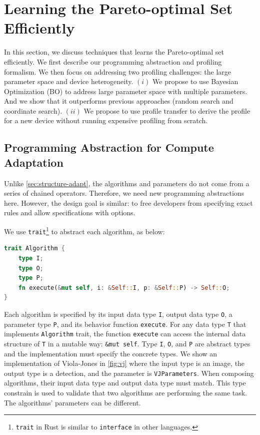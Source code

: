 \section{Learning the Pareto-optimal Set Efficiently }
\label{sec:learn-pareto-optim}

In this section, we discuss techniques that learns the Pareto-optimal set
efficiently. We first describe our programming abstraction and profiling
formalism. We then focus on addressing two profiling challenges: the large
parameter space and device heterogeneity. $(i)$ We propose to use Bayesian
Optimization (BO) to address large parameter space with multiple parameters. And
we show that it outperforms previous approaches (random search and coordinate
search). $(ii)$ We propose to use profile transfer to derive the profile for a
new device without running expensive profiling from scratch.

\subsection{Programming Abstraction for Compute Adaptation}
\label{sec:progr-abstr}

Unlike \autoref{sec:structure-adapt}, the algorithms and parameters do not come
from a series of chained operators. Therefore, we need new programming
abstractions here. However, the design goal is similar: to free developers from
specifying exact rules and allow specifications with options.

We use \texttt{trait}\footnote{\texttt{trait} in Rust is similar to
  \texttt{interface} in other languages.} to abstract each algorithm, as below:

\begin{lstlisting}[xleftmargin=.1\textwidth, xrightmargin=.1\textwidth, language=Rust]
trait Algorithm {
    type I;
    type O; 
    type P;
    fn execute(&mut self, i: &Self::I, p: &Self::P) -> Self::O;
}
\end{lstlisting}

Each algorithm is specified by its input data type \texttt{I}, output data type
\texttt{O}, a parameter type \texttt{P}, and its behavior function
\texttt{execute}. For any data type \texttt{T} that implements
\texttt{Algorithm} trait, the function \texttt{execute} can access the internal
data structure of \texttt{T} in a mutable way: \texttt{\&mut self}. Type
\texttt{I}, \texttt{O}, and \texttt{P} are abstract types and the implementation
must specify the concrete types. We show an implementation of Viola-Jones in
\autoref{fig:vj} where the input type is an image, the output type is a
detection, and the parameter is \texttt{VJParameters}. When composing
algorithms, their input data type and output data type must match. This type
constrain is used to validate that two algorithms are performing the same
task. The algorithms' parameters can be different.

